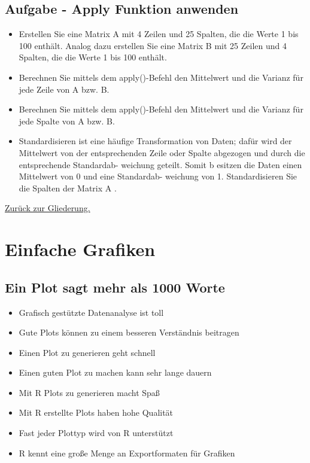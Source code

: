 \documentclass[]{article}
\providecommand{\tightlist}{%
  \setlength{\itemsep}{0pt}\setlength{\parskip}{0pt}}
\begin{document}
\subsection{Aufgabe - Apply Funktion
anwenden}\label{aufgabe---apply-funktion-anwenden}

\begin{itemize}
\item
  Erstellen Sie eine Matrix A mit 4 Zeilen und 25 Spalten, die die Werte
  1 bis 100 enthält. Analog dazu erstellen Sie eine Matrix B mit 25
  Zeilen und 4 Spalten, die die Werte 1 bis 100 enthält.
\item
  Berechnen Sie mittels dem apply()-Befehl den Mittelwert und die
  Varianz für jede Zeile von A bzw. B.
\item
  Berechnen Sie mittels dem apply()-Befehl den Mittelwert und die
  Varianz für jede Spalte von A bzw. B.
\item
  Standardisieren ist eine häufige Transformation von Daten; dafür wird
  der Mittelwert von der entsprechenden Zeile oder Spalte abgezogen und
  durch die entsprechende Standardab- weichung geteilt. Somit b esitzen
  die Daten einen Mittelwert von 0 und eine Standardab- weichung von 1.
  Standardisieren Sie die Spalten der Matrix A .
\end{itemize}

\href{https://github.com/Japhilko/IntroR/blob/master/2017/README.md}{Zurück
zur Gliederung.}

\section{Einfache Grafiken}\label{einfache-grafiken}

\subsection{Ein Plot sagt mehr als 1000
Worte}\label{ein-plot-sagt-mehr-als-1000-worte}

\begin{itemize}
\tightlist
\item
  Grafisch gestützte Datenanalyse ist toll
\item
  Gute Plots können zu einem besseren Verständnis beitragen
\item
  Einen Plot zu generieren geht schnell
\item
  Einen guten Plot zu machen kann sehr lange dauern
\item
  Mit R Plots zu generieren macht Spaß
\item
  Mit R erstellte Plots haben hohe Qualität
\item
  Fast jeder Plottyp wird von R unterstützt
\item
  R kennt eine große Menge an Exportformaten für Grafiken
\end{itemize}
\end{document}
